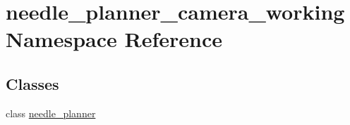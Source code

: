 \hypertarget{namespaceneedle__planner__camera__working}{}\section{needle\+\_\+planner\+\_\+camera\+\_\+working Namespace Reference}
\label{namespaceneedle__planner__camera__working}
\subsection*{Classes}
\begin{DoxyCompactItemize}
\item 
class \hyperlink{classneedle__planner__camera__working_1_1needle__planner}{needle\+\_\+planner}
\end{DoxyCompactItemize}

